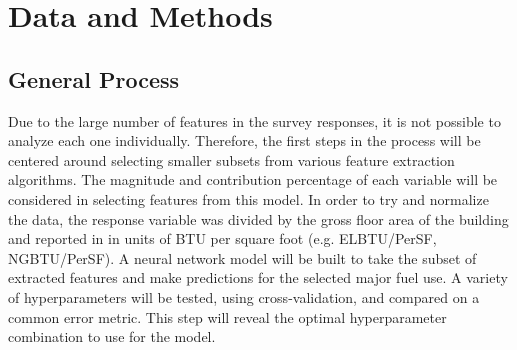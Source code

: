 \section{Data and Methods}
\subsection{General Process}

Due to the large number of features in the survey responses, it is not possible to analyze each one individually.  Therefore, the first steps in the process will be centered around selecting smaller subsets from various feature extraction algorithms.  The magnitude and contribution percentage of each variable will be considered in selecting features from this model.  In order to try and normalize the data, the response variable was divided by the gross floor area of the building and reported in in units of BTU per square foot (e.g. ELBTU/PerSF, NGBTU/PerSF). A neural network model will be built to take the subset of extracted features and make predictions for the selected major fuel use.  A variety of hyperparameters will be tested, using cross-validation, and compared on a common error metric.  This step will reveal the optimal hyperparameter combination to use for the model.